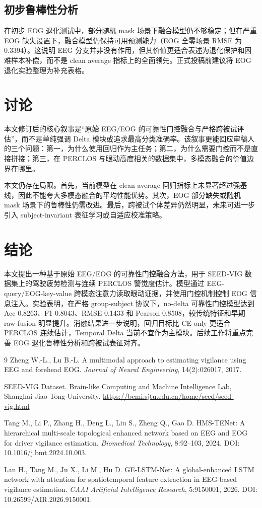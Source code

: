 \documentclass[UTF8,a4paper,11pt,fontset=windows]{ctexart}
\begin{document}
\subsection{初步鲁棒性分析}
在初步 EOG 退化测试中，部分随机 mask 场景下融合模型仍不够稳定；但在严重 EOG 缺失设置下，融合模型仍保持可用预测能力（EOG 全零场景 RMSE 为 0.3394）。这说明 EEG 分支并非没有作用，但其价值更适合表述为退化保护和困难样本补偿，而不是 clean average 指标上的全面领先。正式投稿前建议将 EOG 退化实验整理为补充表格。

\section{讨论}
本文修订后的核心叙事是“原始 EEG/EOG 的可靠性门控融合与严格跨被试评估”，而不是单纯强调 Delta 模块或追求最高分类准确率。该叙事更能回应审稿人的三个问题：第一，为什么使用回归作为主任务；第二，为什么需要门控而不是直接拼接；第三，在 PERCLOS 与眼动高度相关的数据集中，多模态融合的价值边界在哪里。

本文仍存在局限。首先，当前模型在 clean average 回归指标上未显著超过强基线，因此不能夸大多模态融合的平均性能优势。其次，EOG 部分缺失或随机 mask 场景下的鲁棒性仍需改进。最后，跨被试个体差异仍然明显，未来可进一步引入 subject-invariant 表征学习或自适应校准策略。

\section{结论}
本文提出一种基于原始 EEG/EOG 的可靠性门控融合方法，用于 SEED-VIG 数据集上的驾驶疲劳检测与连续 PERCLOS 警觉度估计。模型通过 EEG-query/EOG-key-value 跨模态注意力读取眼动证据，并使用门控机制控制 EOG 信息注入。实验表明，在严格 group-subject 协议下，no-delta 可靠性门控模型达到 Acc 0.8263、F1 0.8043、RMSE 0.1433 和 Pearson 0.8508，较传统特征和早期 raw fusion 明显提升。消融结果进一步说明，回归目标比 CE-only 更适合 PERCLOS 连续估计，Temporal Delta 当前不宜作为主模块。后续工作将重点完善 EOG 退化鲁棒性分析和跨被试表征对齐。

\begin{thebibliography}{9}
Zheng W.-L., Lu B.-L. A multimodal approach to estimating vigilance using EEG and forehead EOG. \textit{Journal of Neural Engineering}, 14(2):026017, 2017.

SEED-VIG Dataset. Brain-like Computing and Machine Intelligence Lab, Shanghai Jiao Tong University. \url{https://bcmi.sjtu.edu.cn/home/seed/seed-vig.html}

Tang M., Li P., Zhang H., Deng L., Liu S., Zheng Q., Gao D. HMS-TENet: A hierarchical multi-scale topological enhanced network based on EEG and EOG for driver vigilance estimation. \textit{Biomedical Technology}, 8:92--103, 2024. DOI: 10.1016/j.bmt.2024.10.003.

Lan H., Tang M., Ju X., Li M., Hu D. GE-LSTM-Net: A global-enhanced LSTM network with attention for spatiotemporal feature extraction in EEG-based vigilance estimation. \textit{CAAI Artificial Intelligence Research}, 5:9150001, 2026. DOI: 10.26599/AIR.2026.9150001.
\end{thebibliography}
\end{document}

